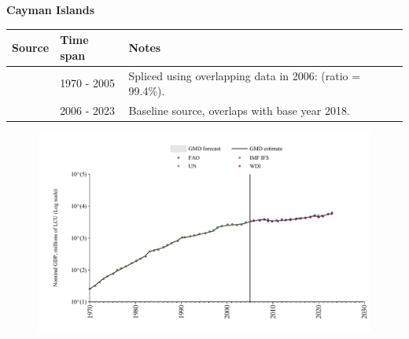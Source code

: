 \documentclass[12pt,a4paper,landscape]{article}
\begin{document}
\begin{adjustbox}{max totalsize={\paperwidth}{\paperheight},center}
\begin{minipage}[t][\textheight][t]{\textwidth}
\vspace*{0.5cm}
{}
\begin{center}
{\Large\bfseries Cayman Islands}
\end{center}
\vspace{0.5cm}
\begin{table}[H]
\centering
\small
\begin{tabular}{|l|l|l|}
\hline
\textbf{Source} & \textbf{Time span} & \textbf{Notes} \\
\hline
\rowcolor{white}\cite{UN}& 1970 - 2005 &Spliced using overlapping data in 2006: (ratio = 99.4\%).\\
\rowcolor{lightgray}\cite{WDI}& 2006 - 2023 &Baseline source, overlaps with base year 2018.\\
\hline
\end{tabular}
\end{table}
\begin{figure}[H]
\centering
\includegraphics[width=\textwidth,height=0.6\textheight,keepaspectratio]{graphs/CYM_nGDP.pdf}
\end{figure}
\end{minipage}
\end{adjustbox}
\end{document}
